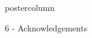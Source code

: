 \documentclass{beamer}
\begin{document}
\begin{frame}
\begin{columns}
\begin{column}{.249\textwidth}
\begin{beamercolorbox}[center]{postercolumn}
\begin{minipage}{.98\textwidth}
{\begin{myblock}{6 - Acknowledgements}



\end{myblock}\vfill		
				
	}\end{minipage}\end{beamercolorbox}
		\end{column}
		
\end{columns}
\end{frame}
\end{document}
